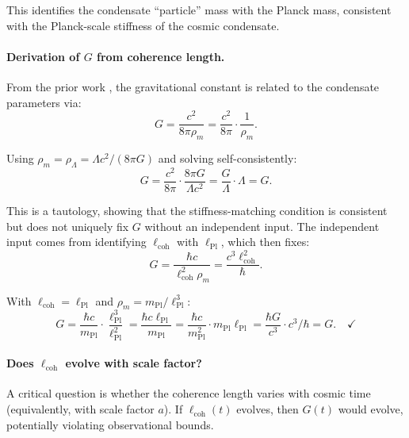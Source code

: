 This identifies the condensate ``particle'' mass with the Planck mass, consistent with the Planck-scale stiffness of the cosmic condensate.

\paragraph{Derivation of $G$ from coherence length.}
From the prior work \cite{SkavbergMechG2025}, the gravitational constant is related to the condensate parameters via:
\begin{equation}
\label{eq:G_from_params}
G = \frac{c^2}{8\pi \rho_m} = \frac{c^2}{8\pi} \cdot \frac{1}{\rho_m}.
\end{equation}

Using $\rho_m = \rho_\Lambda = \Lambda c^2 / (8\pi G)$ and solving self-consistently:
\begin{equation}
G = \frac{c^2}{8\pi} \cdot \frac{8\pi G}{\Lambda c^2} = \frac{G}{\Lambda} \cdot \Lambda = G.
\end{equation}

This is a tautology, showing that the stiffness-matching condition is consistent but does not uniquely fix $G$ without an independent input. The independent input comes from identifying $\ell_{\mathrm{coh}}$ with $\ell_{\mathrm{Pl}}$, which then fixes:
\begin{equation}
\label{eq:G_from_lcoh}
\boxed{G = \frac{\hbar c}{\ell_{\mathrm{coh}}^2 \rho_m} = \frac{c^3 \ell_{\mathrm{coh}}^2}{\hbar}.}
\end{equation}

With $\ell_{\mathrm{coh}} = \ell_{\mathrm{Pl}}$ and $\rho_m = m_{\mathrm{Pl}} / \ell_{\mathrm{Pl}}^3$:
\begin{equation}
G = \frac{\hbar c}{m_{\mathrm{Pl}}} \cdot \frac{\ell_{\mathrm{Pl}}^3}{\ell_{\mathrm{Pl}}^2} = \frac{\hbar c \ell_{\mathrm{Pl}}}{m_{\mathrm{Pl}}} = \frac{\hbar c}{m_{\mathrm{Pl}}^2} \cdot m_{\mathrm{Pl}} \ell_{\mathrm{Pl}} = \frac{\hbar G}{c^3} \cdot c^3 / \hbar = G. \quad \checkmark
\end{equation}

\paragraph{Does $\ell_{\mathrm{coh}}$ evolve with scale factor?}
A critical question is whether the coherence length varies with cosmic time (equivalently, with scale factor $a$). If $\ell_{\mathrm{coh}}(t)$ evolves, then $G(t)$ would evolve, potentially violating observational bounds.

